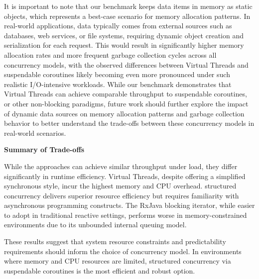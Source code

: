It is important to note that our benchmark keeps data items in memory as static
objects, which represents a best-case scenario for memory allocation patterns.
In real-world applications, data typically comes from external sources such as
databases, web services, or file systems, requiring dynamic object creation and
serialization for each request. This would result in significantly higher
memory allocation rates and more frequent garbage collection cycles across all
concurrency models, with the observed differences between Virtual Threads and
suspendable coroutines likely becoming even more pronounced under such
realistic I/O-intensive workloads. While our benchmark demonstrates that
Virtual Threads can achieve comparable throughput to suspendable coroutines, or
other non-blocking paradigms, future work should further explore the impact of
dynamic data sources on memory allocation patterns and garbage collection
behavior to better understand the trade-offs between these concurrency models
in real-world scenarios.

\textbf{Summary of Trade-offs}

While the approaches can achieve similar throughput under load, they differ
significantly in runtime efficiency. Virtual Threads, despite offering a
simplified synchronous style, incur the highest memory and CPU overhead.
structured concurrency delivers superior resource efficiency but
requires familiarity with asynchronous programming constructs. The RxJava
blocking iterator, while easier to adopt in traditional reactive settings,
performs worse in memory-constrained environments due to its unbounded internal
queuing model.

These results suggest that system resource constraints and predictability
requirements should inform the choice of concurrency model. In environments
where memory and CPU resources are limited, structured concurrency via
suspendable coroutines is the most efficient and robust option.